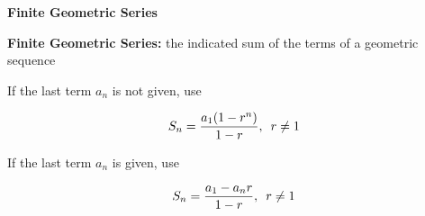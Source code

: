\begin{center}
\textbf{Finite Geometric Series}
\end{center}

\vspace*{1ex}

\textbf{Finite Geometric Series:} the indicated sum of the terms of a geometric sequence 

\vspce

If the last term $a_n$ is not given, use

$$\displaystyle S_n = \frac{a_1(1-r^n)}{1-r},\hspace{0.5em} r\neq1$$

\vspce

If the last term $a_n$ is given, use

$$\displaystyle S_n = \frac{a_1-a_{n}r}{1-r}, \hspace{0.5em} r\neq1$$

